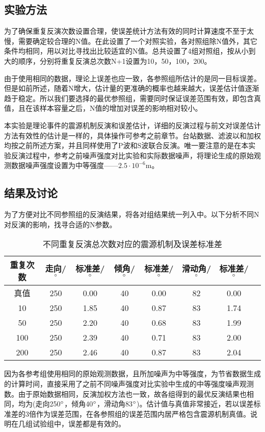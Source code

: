 \subsection{实验方法}
为了确保重复反演次数设置合理，使误差统计方法有效的同时计算速度不至于太慢，需要确定较合理的N值。在此设置了一个对照实验，各对照组除N值外，其它条件均相同，用以对比寻找出比较适宜的N值。总共设置了4组对照组，按从小到大的顺序，分别将重复反演总次数N+1设置为10，50，100，200。

由于使用相同的数据，理论上误差也应一致，各参照组所估计的是同一目标误差。但是如前所述，随着N增大，估计量的更准确的概率也越来越大，误差估计值逐渐趋于稳定。所以我们要选择的最优参照组，需要同时保证误差范围有效，即包含真值，且在该样本容量之后，N值的增加对误差的影响相对较小。

本实验是理论事件的震源机制反演和误差估计，详细的反演过程与前文对误差估计方法有效性的估计是一样的，具体操作可参考之前章节。台站数据、滤波以和加权均按之前所述方案，并且同样使用了P波和S波联合反演。唯一要注意的是在本实验反演过程中，参考之前噪声强度对比实验和实际数据噪声，将理论生成的原始观测数据噪声强度设置为中等强度——$2.5\cdot10^{-6}$m。

\subsection{结果及讨论}
为了方便对比不同参照组的反演结果，将各对组结果统一列入中。以下分析不同N对反演的影响，找寻合适的N参数。
\begin{table}[ht]
\centering
\caption{不同重复反演总次数对应的震源机制及误差标准差}
\label{tab3_07}
    \begin{tabular}{c c c c c c c c}
    \hline
    重复次数 & 走向/$^\circ$ & 标准差/$^\circ$ & 倾角/$^\circ$ & 标准差/$^\circ$ & 滑动角/$^\circ$ & 标准差/$^\circ$\\
    \hline
    真值		& 250 & 0.00 & 40 & 0.00 & 82 & 0.00 \\
    10			& 250 & 1.85 & 40 & 0.87 & 83 & 1.74 \\
    50			& 250 & 2.20 & 40 & 0.68 & 83 & 1.99 \\
    100		& 250 & 2.39 & 40 & 0.71 & 83 & 2.00 \\
    200		& 250 & 2.46 & 40 & 0.87 & 83 & 2.04 \\
    \hline
    \end{tabular}
\end{table}

因为各参考组使用相同的原始观测数据，且所加噪声为中等强度，为节省数据生成的计算时间，直接采用了之前不同噪声强度对比实验中生成的中等强度噪声观测数。由于原始数据相同，反演加权方法也一致，故各组得到的最优反演结果也相同，均为(走向250$^\circ$，倾角40$^\circ$，滑动角83$^\circ$)。估计值与真值非常接近，若以误差标准差的3倍作为误差范围，在各参照组的误差范围内居严格包含震源机制真值。说明在几组试验组中，误差都是有效的。

